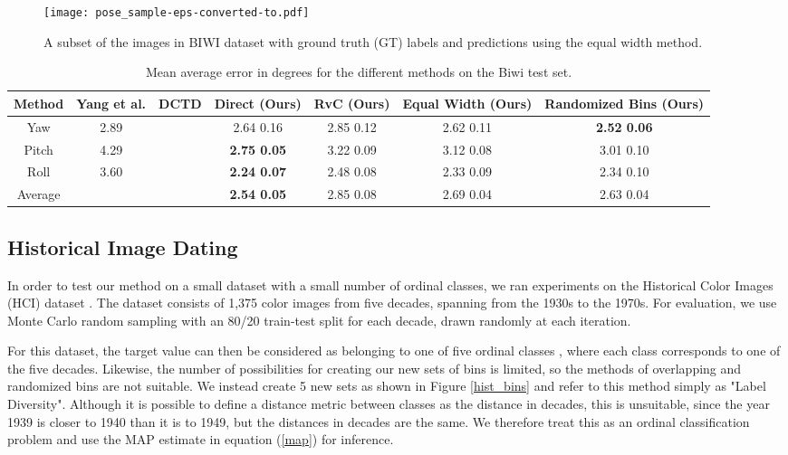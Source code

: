 \documentclass[10pt, conference, a4paper]{IEEEtran}
\begin{document}
\begin{figure}[t]
  \centering
  \texttt{[image: pose\_sample-eps-converted-to.pdf]}
  \caption{A subset of the images in BIWI dataset \cite{eth_biwi_00839} with ground truth (GT) labels and predictions using the equal width method.}
\label{biwi_preview}
\end{figure}

\begin{table*}[t]
\vspace{0.1in}
\renewcommand{\arraystretch}{1.3}
\caption{Mean average error in degrees for the different methods on the Biwi \cite{eth_biwi_00839} test set.}
\label{biwiresults}
\centering
\begin{tabular}{c c c c c c c}
\hline
Method & Yang et al. \cite{yang2019fsa}   & DCTD \cite{gustafsson2019dctd} & Direct (Ours) & RvC (Ours) & Equal Width (Ours) & Randomized Bins (Ours)\\ \hline
Yaw & 2.89 &  & 2.64  0.16 & 2.85  0.12 & 2.62  0.11 & \textbf{2.52  0.06}  \\
Pitch & 4.29 &  & \textbf{2.75  0.05} & 3.22  0.09 & 3.12  0.08 & 3.01  0.10 \\
Roll & 3.60 &  & \textbf{2.24  0.07} & 2.48  0.08 & 2.33  0.09 & 2.34  0.10 \\
\hline
Average &  &  & \textbf{2.54  0.05} & 2.85  0.08 & 2.69  0.04 & 2.63  0.04 \\
\hline
\end{tabular}
\end{table*}

\subsection{Historical Image Dating}
In order to test our method on a small dataset with a small number of ordinal classes, we ran experiments on the Historical Color Images (HCI) dataset \cite{DBLP:conf/eccv/PalermoHE12}. The dataset consists of 1,375 color images from five decades, spanning from the 1930s to the 1970s. For evaluation, we use Monte Carlo random sampling with an 80/20 train-test split for each decade, drawn randomly at each iteration.

For this dataset, the target value can then be considered as belonging to one of five ordinal classes , where each class corresponds to one of the five decades.  Likewise, the number of possibilities for creating our new sets of bins is limited, so the methods of overlapping and randomized bins are not suitable. We instead create 5 new sets  as shown in Figure \ref{hist_bins} and refer to this method simply as "Label Diversity". Although it is possible to define a distance metric between classes as the distance in decades, this is unsuitable, since the year 1939 is closer to 1940 than it is to 1949, but the distances in decades are the same. We therefore treat this as an ordinal classification problem and use the MAP estimate in equation (\ref{map}) for inference. 
\end{document}
